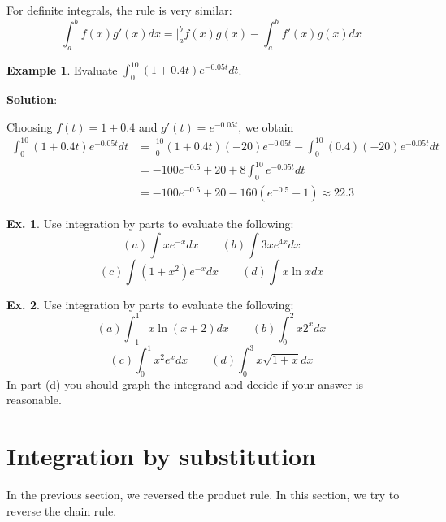 \documentclass[10pt,a4paper]{book}
\theoremstyle{definition}\newtheorem{definition}{Definition}
\theoremstyle{definition}\newtheorem{fact}{Fact}
\theoremstyle{definition}\newtheorem{ex}{Ex.}
\theoremstyle{definition}\newtheorem{project}{Project}
\theoremstyle{definition}\newtheorem{problem}{Problem}
\theoremstyle{definition}\newtheorem{example}{Example}
\numberwithin{theorem}{chapter}
\numberwithin{corollary}{chapter}
\numberwithin{assumption}{chapter}
\numberwithin{definition}{chapter}
\numberwithin{prop}{chapter}
\numberwithin{notation}{chapter}
\numberwithin{problem}{chapter}
\numberwithin{example}{chapter}
\numberwithin{fact}{chapter}
\numberwithin{ex}{chapter}
\begin{document}
	For definite integrals, the rule is very similar:
	$$\int_a^b f(x)g'(x) dx = \bigg |_a^bf(x)g(x) - \int_a^b f'(x)g(x) dx $$
	
	\begin{example}
		Evaluate $\int_0^{10}(1+0.4t)e^{-0.05t} dt$.
		
		\textbf{Solution}:
		
		Choosing $f(t) = 1+0.4$ and $g'(t) = e^{-0.05t}$, we obtain
		\begin{align*}
			\int_0^{10}(1+0.4t)e^{-0.05t} dt & = \bigg |_0^{10}(1+0.4t)(-20)e^{-0.05t} - \int_0^{10}(0.4)(-20)e^{-0.05t}dt \\
			& = -100e^{-0.5} + 20 + 8\int_0^{10}e^{-0.05t}dt                              \\
			& = -100e^{-0.5} + 20 - 160(e^{-0.5}-1) \approx 22.3                          
		\end{align*}
	\end{example}
	
	\begin{ex}
		Use integration by parts to evaluate the following:
		\begin{equation*}
			(a) \int xe^{-x} dx \qquad
			(b) \int 3x e^{4x}dx
		\end{equation*}
		\begin{equation*}
			(c) \int (1+x^2)e^{-x}dx \qquad
			(d) \int x \ln x dx
		\end{equation*}
	\end{ex}
	
	\begin{ex}
		Use integration by parts to evaluate the following:
		\begin{equation*}
			(a) \int_{-1}^1 x\ln (x+2) dx \qquad
			(b) \int_0^2 x 2^x dx
		\end{equation*}
		\begin{equation*}
			(c) \int_0^1 x^2 e^x dx \qquad
			(d) \int_0^3 x \sqrt{1+x} dx
		\end{equation*}
		In part (d) you should graph the integrand and decide if your answer is reasonable.
	\end{ex}
	
	\section{Integration by substitution}
	
	In the previous section, we reversed the product rule. In this section, we try to reverse the chain rule.
	
\end{document}
